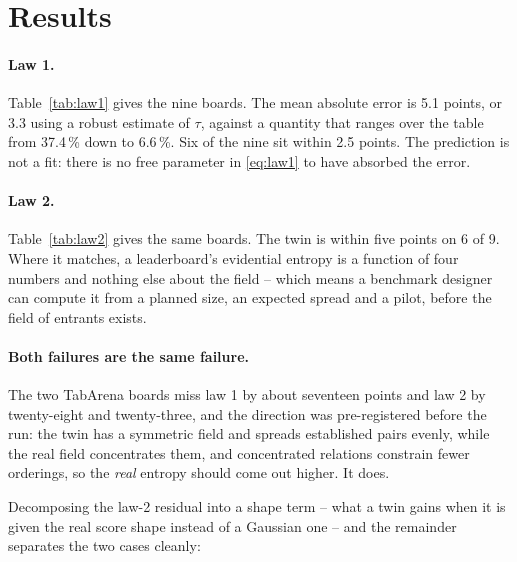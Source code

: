 \documentclass[10pt]{article}
\begin{document}
\section{Results}

\paragraph{Law 1.} Table~\ref{tab:law1} gives the nine boards. The mean
absolute error is 5.1 points, or 3.3 using a robust estimate of
$\tau$, against a quantity that ranges over the table from
37.4\,\% down to 6.6\,\%.
Six of the nine sit within 2.5 points. The
prediction is not a fit:
there is no free parameter in \eqref{eq:law1} to have absorbed the error.

\paragraph{Law 2.} Table~\ref{tab:law2} gives the same boards. The twin is
within five points on 6 of 9. Where it matches, a leaderboard's evidential
entropy is a function of four numbers and nothing else about the field --
which means a benchmark designer can compute it from a planned size, an
expected spread and a pilot, before the field of entrants exists.

\paragraph{Both failures are the same failure.} The two TabArena boards
miss law 1 by about seventeen points and law 2 by twenty-eight and
twenty-three, and the direction was pre-registered before the run: the twin
has a symmetric field and spreads established pairs evenly, while the real
field concentrates them, and concentrated relations constrain fewer
orderings, so the \emph{real} entropy should come out higher. It does.

Decomposing the law-2 residual into a shape term -- what a twin gains when
it is given the real score shape instead of a Gaussian one -- and the
remainder separates the two cases cleanly:
\end{document}
